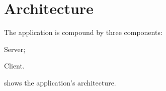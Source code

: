 \chapter{Architecture}\label{ch:arch}

The application is compound by three components:
\begin{enumerate*}[label=]
	\item Server;
	\item Client.
\end{enumerate*}

 shows the application's architecture.






